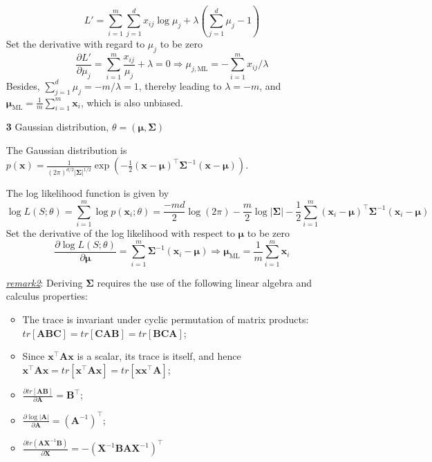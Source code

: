 \documentclass{article}
\begin{document}
\begin{itemize}
	\begin{equation*}
	L' = \sum_{i=1}^m \sum_{j=1}^d x_{ij} \log \mu_j + \lambda \left( \sum_{j=1}^d \mu_j - 1 \right)
	\end{equation*}
Set the derivative with regard to  $\mu_j$ to be zero
	\begin{equation*}
	\frac{\partial L'}{\partial \mu_j} = \sum_{i=1}^m\frac{x_{ij}}{\mu_j} + \lambda = 0  \Longrightarrow	 \mu_{j,\mathrm{ML}} = -\sum_{i=1}^m x_{ij}/\lambda
	\end{equation*}
Besides, $\sum_{j=1}^d \mu_j=-m/\lambda=1$, thereby leading to $\lambda=-m$, and $\bm{\mu}_{\mathrm{ML}} = \frac{1}{m}\sum_{i=1}^m \bm{x}_i$, which is also unbiased.
	
	\item [\textbf{3}] Gaussian distribution, $\theta=(\bm{\mu},\bm{\Sigma})$
	
	The Gaussian distribution is  $p(\bm{x}) = \frac{1}{(2\pi)^{d/2} |\bm{\Sigma}|^{1/2}} \exp \left( -\frac{1}{2} (\bm{x} - \bm{\mu})^\top \bm{\Sigma}^{-1} (\bm{x} - \bm{\mu})\right)$.
	
	The log likelihood function is given by
	\begin{equation*}
	\log L(S;\theta) = \sum_{i=1}^m \log p(\bm{x}_i;\theta) 
	= \frac{-md}{2} \log (2\pi) - \frac{m}{2}\log |\bm{\Sigma}| - \frac{1}{2} \sum_{i=1}^m (\bm{x}_i - \bm{\mu})^\top \bm{\Sigma}^{-1} (\bm{x}_i - \bm{\mu})
	\end{equation*}
	Set the derivative of the log likelihood with respect to $\bm{\mu}$ to be zero
	\begin{equation*}
	\frac{\partial \log L(S;\theta)}{\partial \bm{\mu}} = \sum_{i=1}^m \bm{\Sigma}^{-1} (\bm{x}_i - \bm{\mu}) \Longrightarrow	 \bm{\mu}_{\mathrm{ML}}= \frac{1}{m} \sum_{i=1}^m \bm{x}_i
	\end{equation*}	
	
	
	\begin{footnotesize}
	\textit{\underline{remark2}}: Deriving $\bm{\Sigma}$ requires the use of the following linear algebra and calculus properties:	
	\begin{itemize}
	\item The trace is invariant under cyclic permutation of matrix products: $tr[\bm{A}\bm{B}\bm{C}]=tr[\bm{C}\bm{A}\bm{B}]=tr[\bm{B}\bm{C}\bm{A}]$;
	\item Since $\bm{x}^\top \bm{A} \bm{x}$ is a scalar, its trace is itself, and hence $\bm{x}^\top \bm{A} \bm{x} = tr[\bm{x}^\top \bm{A} \bm{x}] = tr[\bm{x} \bm{x}^\top \bm{A}]$;
	\item $\frac{\partial tr[\bm{A} \bm{B}]}{\partial \bm{A}} = \bm{B}^\top$;
	\item $\frac{\partial \log |\bm{A}|}{\partial \bm{A}} = (\bm{A}^{-1})^\top$;
	\item $\frac{\partial tr(\bm{A}\bm{X}^{-1}\bm{B})}{\partial \bm{X}} = -(\bm{X}^{-1} \bm{BA}\bm{X}^{-1})^\top$
	\end{itemize}
	\end{footnotesize}
	

\end{itemize}
\end{document}
